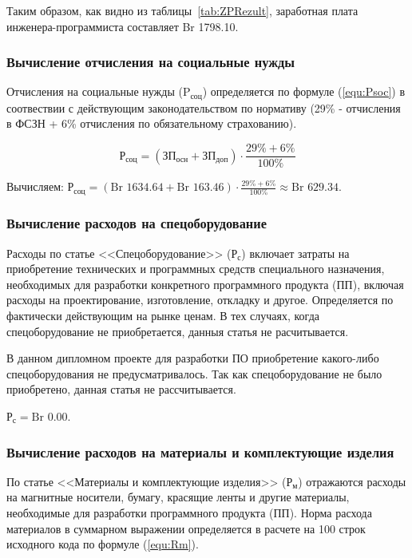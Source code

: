 Таким образом, как видно из таблицы~\ref{tab:ZPRezult}, заработная плата инженера-программиста составляет Br 1798.10.

\subsubsection*{Вычисление отчисления на социальные нужды}

Отчисления на социальные нужды ($\text{P}_\text{соц}$) определяется по формуле (\ref{equ:Psoc})
в соотвествии с действующим законодательством по нормативу
(29\% - отчисления в ФСЗН + 6\% отчисления по обязательному страхованию).

\begin{equation}
    \label{equ:Psoc}
    \text{Р}_\text{соц} = (\text{ЗП}_\text{осн} + \text{ЗП}_\text{доп}) \cdot \frac{ 29\% + 6\% }{ 100\% }
\end{equation}

Вычисляем: $\text{Р}_\text{соц} = (\text{Br } 1634.64 + \text{Br } 163.46) \cdot \frac{ 29\% + 6\% }{ 100\% } \approx \text{Br } 629.34$.

\subsubsection*{Вычисление расходов на спецоборудование}

Расходы по статье <<Спецоборудование>> ($\text{Р}_\text{с}$) включает затраты на приобретение технических и программных средств специального назначения,
необходимых для разработки конкретного программного продукта (ПП),
включая расходы на проектирование, изготовление, откладку и другое.
Определяется по фактически действующим на рынке ценам.
В тех случаях, когда спецоборудование не приобретается, данныя статья не расчитывается.

В данном дипломном проекте для разработки ПО приобретение какого-либо спецоборудования не предусматривалось.
Так как спецоборудование не было приобретено, данная статья не рассчитывается.

$\text{Р}_\text{с} = \text{Br } 0.00$.

\subsubsection*{Вычисление расходов на материалы и комплектующие изделия}

По статье <<Материалы и комплектующие изделия>> ($Р_\text{м}$) отражаются расходы на магнитные носители,
бумагу, красящие ленты и другие материалы,
необходимые для разработки программного продукта (ПП).
Норма расхода материалов в суммарном выражении определяется в расчете на 100 строк исходного кода по формуле (\ref{equ:Rm}).


